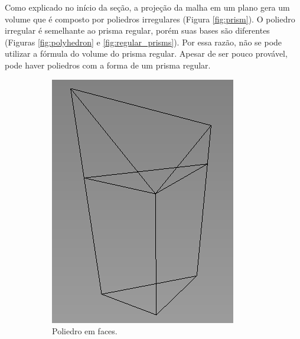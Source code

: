 Como explicado no início da seção, a projeção da malha em um plano gera um volume que é composto por poliedros irregulares (Figura \ref{fig:prism}). O poliedro irregular é semelhante ao prisma regular, porém suas bases são diferentes (Figuras \ref{fig:polyhedron} e \ref{fig:regular_prisms}). Por essa razão, não se pode utilizar a fórmula do volume do prisma regular.  
Apesar de ser pouco provável, pode haver poliedros com a forma de um prisma regular.

\begin{figure}[H]
    \centering
    \begin{subfigure}[t]{0.3\textwidth}
        \includegraphics[width=\textwidth]{dados/figuras/pol_line.png}
        \caption{Poliedro em faces.}
        \label{fig:polyhedron1}
    \end{subfigure}
    \hspace{1em}
    \begin{subfigure}[t]{0.3\textwidth}

\end{subfigure}
\end{figure}
